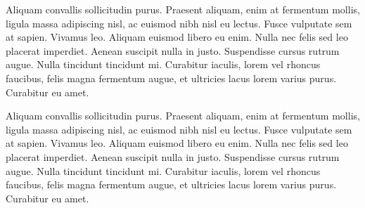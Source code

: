 Aliquam convallis sollicitudin purus. Praesent aliquam, enim at fermentum mollis, ligula massa adipiscing nisl, ac euismod nibh nisl eu lectus. Fusce vulputate sem at sapien. Vivamus leo. Aliquam euismod libero eu enim. Nulla nec felis sed leo placerat imperdiet. Aenean suscipit nulla in justo. Suspendisse cursus rutrum augue. Nulla tincidunt tincidunt mi. Curabitur iaculis, lorem vel rhoncus faucibus, felis magna fermentum augue, et ultricies lacus lorem varius purus. Curabitur eu amet.

Aliquam convallis sollicitudin purus. Praesent aliquam, enim at fermentum mollis, ligula massa adipiscing nisl, ac euismod nibh nisl eu lectus. Fusce vulputate sem at sapien. Vivamus leo. Aliquam euismod libero eu enim. Nulla nec felis sed leo placerat imperdiet. Aenean suscipit nulla in justo. Suspendisse cursus rutrum augue. Nulla tincidunt tincidunt mi. Curabitur iaculis, lorem vel rhoncus faucibus, felis magna fermentum augue, et ultricies lacus lorem varius purus. Curabitur eu amet.
